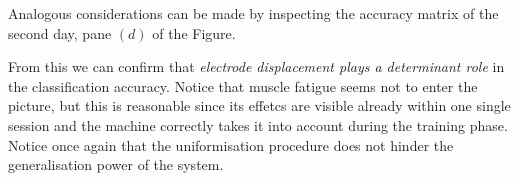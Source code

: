 Analogous considerations can be made by inspecting the accuracy matrix
of the second day, pane $(d)$ of the Figure.

From this we can confirm that \emph{electrode displacement plays a
determinant role} in the classification accuracy. Notice that
muscle fatigue seems not to enter the picture, but this is
reasonable since its effetcs are visible already within one single
session and the machine correctly takes it into account during the
training phase. Notice once again that the uniformisation
procedure does not hinder the generalisation power of the system.

%

